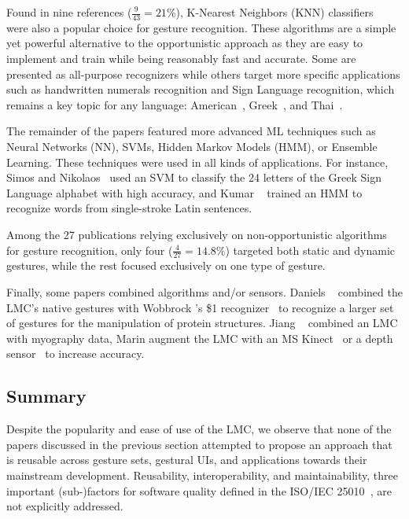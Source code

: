 Found in nine references ($\frac{9}{43}{=}21\%$), K-Nearest Neighbors (KNN) classifiers~\cite{Duda:2000} were also a popular choice for gesture recognition. These algorithms are a simple yet powerful alternative to the opportunistic approach as they are easy to implement and train while being reasonably fast and accurate. Some are presented as all-purpose recognizers \cite{Caputo:2017,Taranta:2017} while others target more specific applications such as handwritten numerals recognition \cite{Chiang:2017} and Sign Language recognition, which remains a key topic for any language: American~\cite{Ferreira:2019,Kumar:2017b,Mapari:2016,Schioppo:2019}, Greek~\cite{Simos:2016}, and Thai~\cite{Thaweesitthichat:2018}.

The remainder of the papers featured more advanced ML techniques such as Neural Networks (NN), SVMs, Hidden Markov Models (HMM), or Ensemble Learning. These techniques were used in all kinds of applications. For instance, Simos and Nikolaos~\cite{Simos:2016} used an SVM to classify the 24 letters of the Greek Sign Language alphabet with high accuracy, and Kumar \etal~\cite{Kumar:2017a} trained an HMM to recognize words from single-stroke Latin sentences.

Among the 27 publications relying exclusively on non-opportunistic algorithms for gesture recognition, only four ($\frac{4}{27}{=}14.8\%$) targeted both static and dynamic gestures, while the rest focused exclusively on one type of gesture.

Finally, some papers combined algorithms and/or sensors. Daniels \etal~\cite{Daniels:2014} combined the LMC's native gestures with Wobbrock \etal's \$1 recognizer~\cite{Wobbrock:2007} to recognize a larger set of gestures for the manipulation of protein structures. Jiang \etal~\cite{Jiang:2018} combined an LMC with myography data, Marin \etal augment the LMC with an MS Kinect~\cite{Marin:2014} or a depth sensor~\cite{Marin:2016} to increase accuracy. 

\subsection{Summary} \label{sec:state_of_the_art:lmc:summary}
Despite the popularity and ease of use of the LMC, we observe that none of the papers discussed in the previous section attempted to propose an approach that is reusable across gesture sets, gestural UIs, and applications towards their mainstream development. Reusability, interoperability, and maintainability, three important (sub-)factors for software quality defined in the ISO/IEC 25010~\cite{iso25010}, are not explicitly addressed.


